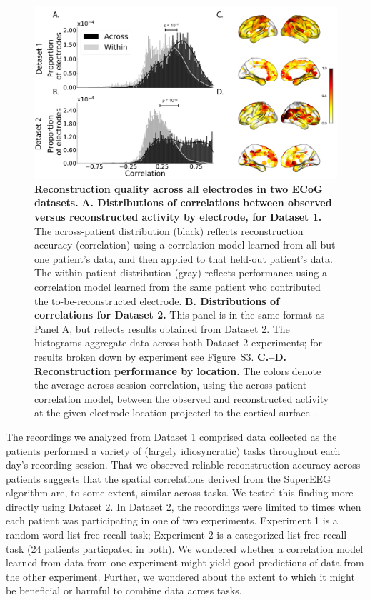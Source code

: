 \documentclass[11pt]{article}
\newcommand{\perexptaskreconseparated}{S3}
\begin{document}
\begin{figure}
  \centering
  \includegraphics[width=\textwidth]{figs/corrmap}
  \caption{\textbf{Reconstruction quality across all electrodes in two
      ECoG datasets.}  \textbf{A. Distributions of correlations
      between observed versus reconstructed activity by electrode, for
      Dataset 1.}  The across-patient distribution (black) reflects
    reconstruction accuracy (correlation) using a correlation model
    learned from all but one patient's data, and then applied to that
    held-out patient's data.  The within-patient distribution (gray)
    reflects performance using a correlation model learned from the same
    patient who contributed the to-be-reconstructed electrode.
    \textbf{B. Distributions of correlations for Dataset 2.}  This
    panel is in the same format as Panel A, but reflects results
    obtained from Dataset 2.  The histograms aggregate data across
    both Dataset 2 experiments; for results broken down by experiment
    see Figure~\perexptaskreconseparated. \textbf{C.--D.  Reconstruction
      performance by location.} The colors denote the average across-session
    correlation, using the across-patient correlation model, between
    the observed and reconstructed activity at the given electrode
    location projected to the cortical surface~\citep{CombEtal19}.}
  \label{fig:corrmap}
\end{figure}

The recordings we analyzed from Dataset 1 comprised data collected as the
patients performed a variety of (largely idiosyncratic) tasks throughout each
day's recording session.  That we observed reliable reconstruction accuracy
across patients suggests that the spatial correlations derived from the SuperEEG
algorithm are, to some extent, similar across tasks.  We tested this finding
more directly using Dataset 2.  In Dataset 2, the recordings were limited to
times when each patient was participating in one of two experiments.  Experiment
1 is a random-word list free recall task; Experiment 2 is a categorized list
free recall task (24 patients particpated in both).  We wondered whether a
correlation model learned from data from one experiment might yield good
predictions of data from the other experiment.  Further, we wondered about the
extent to which it might be beneficial or harmful to combine data across tasks.
\end{document}
